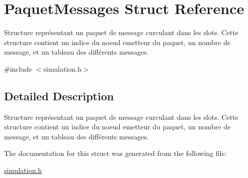 \hypertarget{structPaquetMessages}{}\section{Paquet\+Messages Struct Reference}
\label{structPaquetMessages}


Structure représentant un paquet de message curculant dans les slots. Cette structure contient un indice du noeud emetteur du paquet, un nombre de message, et un tableau des différents messages.  




{\ttfamily \#include $<$simulation.\+h$>$}



\subsection{Detailed Description}
Structure représentant un paquet de message curculant dans les slots. Cette structure contient un indice du noeud emetteur du paquet, un nombre de message, et un tableau des différents messages. 

The documentation for this struct was generated from the following file\+:\begin{DoxyCompactItemize}
\item 
\hyperlink{simulation_8h}{simulation.\+h}\end{DoxyCompactItemize}
